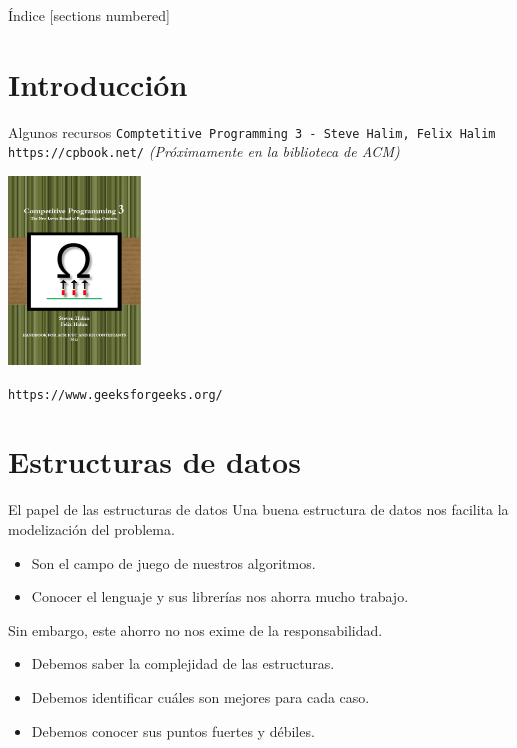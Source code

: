 \documentclass[10pt,handout]{beamer}
\begin{document}
\begin{frame}{Índice}
  [sections numbered]
  \tableofcontents%
\end{frame}

\section{Introducción}

\begin{frame}{Algunos recursos}
  \texttt{Comptetitive Programming 3 - Steve Halim, Felix Halim}
  \texttt{https://cpbook.net/}
  \emph{(Próximamente en la biblioteca de ACM)}
  \begin{center}
    \includegraphics[height=5cm]{cp3.png}
  \end{center}
  \texttt{https://www.geeksforgeeks.org/}
\end{frame}

\section{Estructuras de datos}

\begin{frame}{El papel de las estructuras de datos}
  Una buena estructura de datos nos facilita la modelización del problema.
  \begin{itemize}
  \item Son el campo de juego de nuestros algoritmos.
  \item Conocer el lenguaje y sus librerías nos ahorra mucho trabajo.
  \end{itemize}
  Sin embargo, este ahorro no nos exime de la responsabilidad.
  \begin{itemize}
  \item Debemos saber la complejidad de las estructuras.
  \item Debemos identificar cuáles son mejores para cada caso.
  \item Debemos conocer sus puntos fuertes y débiles.
  \end{itemize}
\end{frame}
\end{document}
